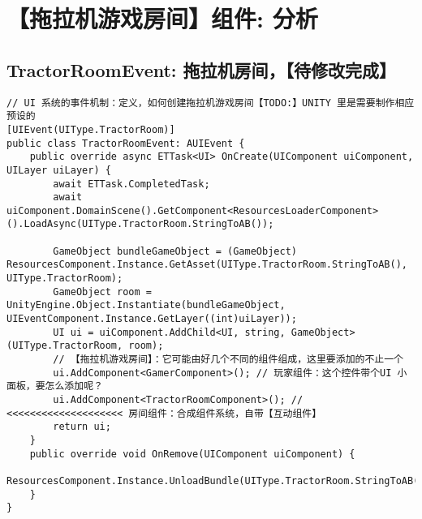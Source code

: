 \documentclass[9pt, b5paper]{article}
\begin{document}
\section{【拖拉机游戏房间】组件: 分析}
\label{sec-4}
\subsection{TractorRoomEvent: 拖拉机房间，【待修改完成】}
\label{sec-4-1}
\begin{verbatim}
// UI 系统的事件机制：定义，如何创建拖拉机游戏房间【TODO:】UNITY 里是需要制作相应预设的
[UIEvent(UIType.TractorRoom)]
public class TractorRoomEvent: AUIEvent {
    public override async ETTask<UI> OnCreate(UIComponent uiComponent, UILayer uiLayer) {
        await ETTask.CompletedTask;
        await uiComponent.DomainScene().GetComponent<ResourcesLoaderComponent>().LoadAsync(UIType.TractorRoom.StringToAB());

        GameObject bundleGameObject = (GameObject) ResourcesComponent.Instance.GetAsset(UIType.TractorRoom.StringToAB(), UIType.TractorRoom);
        GameObject room = UnityEngine.Object.Instantiate(bundleGameObject, UIEventComponent.Instance.GetLayer((int)uiLayer));
        UI ui = uiComponent.AddChild<UI, string, GameObject>(UIType.TractorRoom, room);
        // 【拖拉机游戏房间】：它可能由好几个不同的组件组成，这里要添加的不止一个
        ui.AddComponent<GamerComponent>(); // 玩家组件：这个控件带个UI 小面板，要怎么添加呢？
        ui.AddComponent<TractorRoomComponent>(); // <<<<<<<<<<<<<<<<<<<< 房间组件：合成组件系统，自带【互动组件】
        return ui;
    }
    public override void OnRemove(UIComponent uiComponent) {
        ResourcesComponent.Instance.UnloadBundle(UIType.TractorRoom.StringToAB());
    }
}
\end{verbatim}
\end{document}
